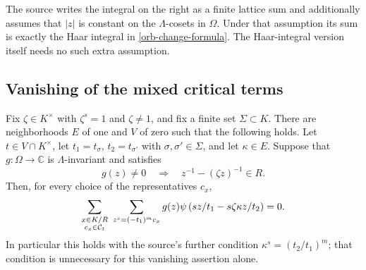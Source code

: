 The source writes the integral on the right as a finite lattice
sum and additionally assumes that $|z|$ is constant on the
$\Lambda$-cosets in $\Omega$.  Under that assumption its sum is
exactly the Haar integral in \eqref{orb-change-formula}.  The
Haar-integral version itself needs no such extra assumption.

\subsection{Vanishing of the mixed critical terms}

\begin{theorem}\label{orb-cross-vanish}
Fix $\zeta\in K^\times$ with $\zeta^s=1$ and $\zeta\ne1$,
and fix a finite set $\Sigma\subset K$.  There are neighborhoods
$E$ of one and $V$ of zero such that the following holds.
Let $t\in V\cap K^\times$, let
$t_1=t_\sigma$, $t_2=t_{\sigma'}$ with
$\sigma,\sigma'\in\Sigma$, and let $\kappa\in E$.
Suppose that $g:\Omega\to\mathbb C$ is $\Lambda$-invariant
and satisfies
\begin{equation}\label{orb-cross-support}
 g(z)\ne0\quad\Longrightarrow\quad
 z^{-1}-(\zeta z)^{-1}\in R.
\end{equation}
Then, for every choice of the representatives $c_x$,
\begin{equation}\label{orb-cross-sum}
 \sum_{\substack{x\in K/R\cr c_x\in\mathcal C_t}}
 \ \sum_{z^s=(-t_1)^m c_x}
 g(z)\psi\left(sz/t_1-s\zeta\kappa z/t_2\right)=0.
\end{equation}
In particular this holds with the source's further condition
$\kappa^s=(t_2/t_1)^m$; that condition is unnecessary for this
vanishing assertion alone.
\end{theorem}

